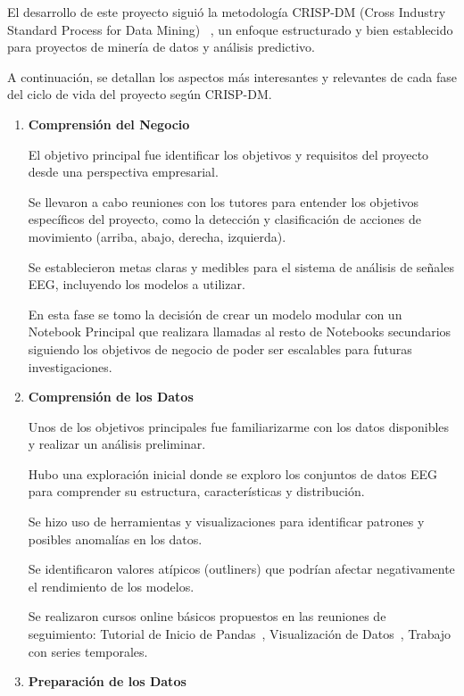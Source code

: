 

El desarrollo de este proyecto siguió la metodología CRISP-DM (Cross Industry Standard Process for Data Mining) ~\cite{wiki:CRISP}, un enfoque estructurado y bien establecido para proyectos de minería de datos y análisis predictivo. 

A continuación, se detallan los aspectos más interesantes y relevantes de cada fase del ciclo de vida del proyecto según CRISP-DM.


\begin{enumerate}
\def\labelenumi{\arabic{enumi}.}	
\item
\textbf{Comprensión del Negocio}

El objetivo principal fue identificar los objetivos y requisitos del proyecto desde una perspectiva empresarial.

Se llevaron a cabo reuniones con los tutores para entender los objetivos específicos del proyecto, como la detección y clasificación de acciones de movimiento (arriba, abajo, derecha, izquierda).

Se establecieron metas claras y medibles para el sistema de análisis de señales EEG, incluyendo los modelos a utilizar.

En esta fase se tomo la decisión de crear un modelo modular con un Notebook Principal que realizara llamadas al resto de Notebooks secundarios siguiendo los objetivos de negocio de poder ser escalables para futuras investigaciones.


\item
\textbf{Comprensión de los Datos}

Unos de los objetivos principales fue familiarizarme con los datos disponibles y realizar un análisis preliminar.

Hubo una exploración inicial donde se exploro los conjuntos de datos EEG para comprender su estructura, características y distribución.

Se hizo uso de herramientas y visualizaciones para identificar patrones y posibles anomalías en los datos.

Se identificaron valores atípicos (outliners) que podrían afectar negativamente el rendimiento de los modelos.

Se realizaron cursos online básicos propuestos en las reuniones de seguimiento:
Tutorial de Inicio de Pandas~\cite{curso:a}, Visualización de Datos~\cite{curso:b}, Trabajo con series temporales.~\cite{curso:c}

\item
\textbf{Preparación de los Datos}


\end{enumerate}
